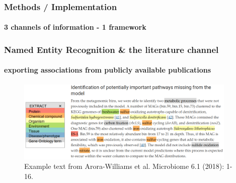 \documentclass{beamer}
\begin{document}
   \begin{frame}
      \frametitle{Methods / Implementation}
      \framesubtitle{3 channels of information - 1 framework}

      \begin{singlespace}
      \end{singlespace}
   \end{frame}

   \begin{frame}
      \frametitle{Named Entity Recognition \& the literature channel}
      \framesubtitle{exporting associations from publicly available publications}
      \begin{figure}
         \includegraphics[width=105mm]{resources/extract_example_transp.png}
         \caption{
            \scriptsize Example text from Arora-Williams et al. Microbiome 6.1 (2018): 1-16.
         }
      \end{figure}
      
   \end{frame}
\end{document}
